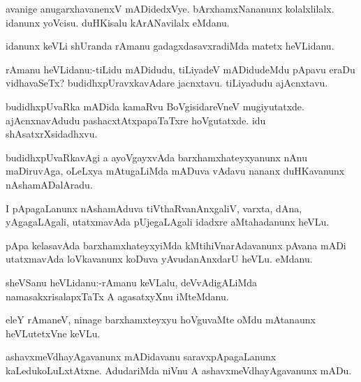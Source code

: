 \documentclass{article}
\begin{document}
\begin{mn}%
avanige anugarxhavanenxV mADidedxVye. bArxhamxNananunx kolalxlilalx. idanunx yoVcisu. 
duHKisalu kArANavilalx eMdanu.
\end{mn}

\begin{mn}%
idanunx keVLi shUranda rAmanu gadagxdasavxradiMda matetx heVLidanu.
\end{mn}

\begin{mn}%
rAmanu heVLidanu:-tiLidu mADidudu, tiLiyadeV mADidudeMdu pApavu eraDu vidhavaSeTx? 
budidhxpUravxkavAdare jacnxtavu. tiLiyadudu ajAcnxtavu.
\end{mn}

\begin{mn}%
budidhxpUvaRka mADida kamaRvu BoVgisidareVneV mugiyutatxde. ajAcnxnavAdudu 
pashacxtAtxpapaTaTxre hoVgutatxde. idu shAsatxrXsidadhxvu.
\end{mn}

\begin{mn}%
budidhxpUvaRkavAgi a ayoVgayxvAda barxhamxhateyxyanunx nAnu maDiruvAga, oLeLxya 
mAtugaLiMda mADuva vAdavu nananx duHKavanunx nAshamADalAradu.
\end{mn}

\begin{mn}%
I pApagaLanunx nAshamAduva tiVthaRvanAnxgaliV, varxta, dAna, yAgagaLAgali, utatxmavAda 
pUjegaLAgali idadxre aMtahadanunx heVLu.
\end{mn}

\begin{mn}%
pApa kelasavAda barxhamxhateyxyiMda kMtihiVnarAdavanunx pAvana mADi utatxmavAda loVkavanunx 
koDuva yAvudanAnxdarU heVLu. eMdanu.
\end{mn}

\begin{mn}%
sheVSanu heVLidanu:-rAmanu keVLalu, deVvAdigALiMda namasakxrisalapxTaTx A agasatxyXnu 
iMteMdanu.
\end{mn}

\begin{mn}%
eleY rAmaneV, ninage barxhamxteyxyu hoVguvaMte oMdu mAtanaunx heVLutetxVne keVLu.
\end{mn}

\begin{mn}%
ashavxmeVdhayAgavanunx mADidavanu saravxpApagaLanunx kaLedukoLuLxtAtxne. AdudariMda niVnu A
ashavxmeVdhayAgavanunx mADu.
\end{mn}
\end{document}
